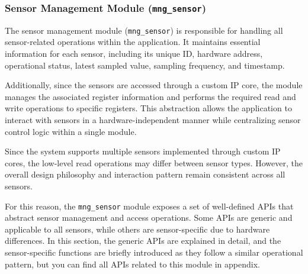 \subsubsection{Sensor Management Module (\texttt{mng\_sensor})}
The sensor management module (\texttt{mng\_sensor}) is responsible for handling all 
sensor-related operations within the application. It maintains essential information 
for each sensor, including its unique ID, hardware address, operational status, latest 
sampled value, sampling frequency, and timestamp.

Additionally, since the sensors are accessed through a custom IP core, the module manages 
the associated register information and performs the required read and write operations 
to specific registers. This abstraction allows the application to interact with sensors 
in a hardware-independent manner while centralizing sensor control logic within a single 
module.

Since the system supports multiple sensors implemented through custom IP cores, the 
low-level read operations may differ between sensor types. However, the overall design 
philosophy and interaction pattern remain consistent across all sensors.

For this reason, the \texttt{mng\_sensor} module exposes a set of well-defined APIs 
that abstract sensor management and access operations. Some APIs are generic and 
applicable to all sensors, while others are sensor-specific due to hardware differences. 
In this section, the generic APIs are explained in detail, and the sensor-specific 
functions are briefly introduced as they follow a similar operational pattern, but you can find all APIs related to this module in appendix.

